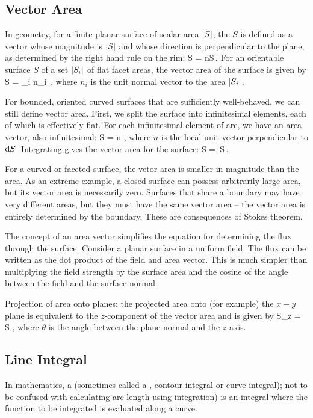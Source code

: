 \subsection{Vector Area}
In geometry, for a finite planar surface of scalar area $\lvert{S}\rvert$, the  $S$ is defined as a vector whose magnitude is $\lvert{S}\rvert$ and whose direction is perpendicular to the plane, as determined by the right hand rule on the rim:
\beq
S = n\magn S\,.
\eeq
For an orientable surface $S$ of a set $\lvert{S_i}\rvert$ of flat facet areas, the vector area of the surface is given by
\beq
S = \sum_i n_i \,,
\eeq
where $n_i$ is the unit normal vector to the area $\lvert{S_i}\rvert$.

For bounded, oriented curved surfaces that are sufficiently well-behaved, we can still define vector area. First, we split the surface into infinitesimal elements, each of which is effectively flat. For each infinitesimal element of are, we have an area vector, also infinitesimal:
\beq
\dx S = n\,\dx{}\,,
\eeq
where $n$ is the local unit vector perpendicular to $\text{d} S$. Integrating gives the vector area for the surface:
\beq
S = \int\,\dx S\,.
\eeq

For a curved or faceted surface, the vetor area is smaller in magnitude than the area. As an extreme example, a closed surface can possess arbitrarily large area, but its vector area is necessarily zero. Surfaces that share a boundary may have very different areas, but they must have the same vector area -- the vector area is entirely determined by the boundary. These are consequences of Stokes theorem.

The concept of an area vector simplifies the equation for determining the flux through the surface. Consider a planar surface in a uniform field. The flux can be written as the dot product of the field and area vector. This is much simpler than multiplying the field strength by the surface area and the cosine of the angle between the field and the surface normal.

Projection of area onto planes: the projected area onto (for example) the $x-y$ plane is equivalent to the $z$-component of the vector area and is given by
\beq
S_z = \magn S\,\cos\vat\theta\,,
\eeq
where $\theta$ is the angle between the plane normal and the $z$-axis.


\subsection{Line Integral}
In mathematics, a  (sometimes called a , contour integral or curve integral); not to be confused with calculating arc length using integration) is an integral where the function to be integrated is evaluated along a curve.

